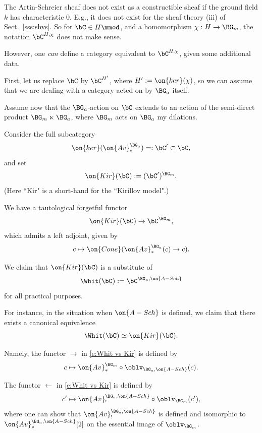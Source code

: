 \documentclass[9pt]{amsart}
\theoremstyle{definition}
\theoremstyle{remark}
\newcommand{\secref}[1]{Sect.~\ref{#1}}
\numberwithin{equation}{section}
\begin{document}

\sssec{}

The Artin-Schreier sheaf does not exist as a constructible sheaf if the ground field $k$ has 
characteristic $0$. E.g., it does not exist for the sheaf theory (iii) of \secref{sss:shvs}. So
for $\bC\in H\mmod$, and a homomorphism $\chi:H\to \BG_m$, the notation $\bC^{H,\chi}$
does not make sense. 

\medskip

However, one \emph{can} define a category equivalent to $\bC^{H,\chi}$, given some additional
data. 

\sssec{}

First, let us replace $\bC$ by $\bC^{H'}$, where $H':=\on{ker}(\chi)$, so we can assume that
we are dealing with a category acted on by $\BG_a$ itself. 

\medskip

Assume now that the $\BG_a$-action on $\bC$ extends to an action of the 
semi-direct product $\BG_m\ltimes \BG_a$, where $\BG_m$ acts on $\BG_a$ my dilations. 

\medskip

Consider the full subcategory
$$\on{ker}(\on{Av}^{\BG_a}_*)=:\bC' \subset \bC,$$
and set
$$\on{Kir}(\bC):=(\bC')^{\BG_m}.$$
(Here ``Kir" is a short-hand for the ``Kirillov model".)

\medskip

We have a tautological forgetful functor
$$\on{Kir}(\bC)\to \bC^{\BG_m},$$
which admits a left adjoint, given by
$$c\mapsto \on{Cone}(\on{Av}^{\BG_a}_*(c)\to c).$$

\sssec{}

We claim that $\on{Kir}(\bC)$ is a substitute of 
$$\Whit(\bC):=\bC^{\BG_a,\on{A-Sch}}$$
for all practical purposes. 

\medskip

For instance, in the situation when $\on{A-Sch}$ is defined, we claim that there exists a canonical
equivalence 
\begin{equation}  \label{e:Whit vs Kir}
\Whit(\bC)\simeq \on{Kir}(\bC).
\end{equation}

Namely, the functor $\to$ in \eqref{e:Whit vs Kir} is defined by
$$c\mapsto \on{Av}^{\BG_m}_*\circ \oblv_{\BG_a,\on{A-Sch}}(c).$$

The functor $\leftarrow$ in \eqref{e:Whit vs Kir} is defined by
$$c'\mapsto \on{Av}^{\BG_a,\on{A-Sch}}_!\circ \oblv_{\BG_m}(c'),$$
where one can show that $\on{Av}^{\BG_a,\on{A-Sch}}_!$ is defined and isomorphic to
$\on{Av}^{\BG_a,\on{A-Sch}}_*[2]$ on the essential image of $\oblv_{\BG_m}$. 
\end{document}
